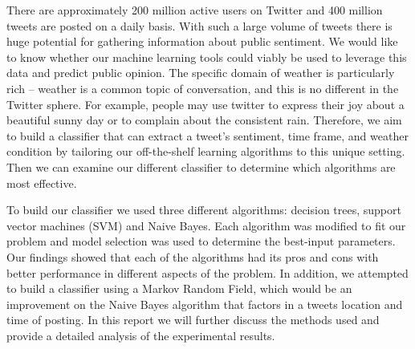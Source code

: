 	There are approximately 200 million active users on Twitter and 400 million tweets are posted on a daily basis. With such a large volume of tweets there is huge potential for gathering information about public sentiment. We would like to know whether our machine learning tools could viably be used to leverage this data and predict public opinion. The specific domain of weather is particularly rich – weather is a common topic of conversation, and this is no different in the Twitter sphere. For example, people may use twitter to express their joy about a beautiful sunny day or to complain about the consistent rain. Therefore, we aim to build a classifier that can extract a tweet's sentiment, time frame, and weather condition by tailoring our off-the-shelf learning algorithms to this unique setting. Then we can examine our different classifier to determine which algorithms are most effective.

            To build our classifier we used three different algorithms: decision trees, support vector machines (SVM) and Naive Bayes. Each algorithm was modified to fit our problem and model selection was used to determine the best-input parameters. Our findings showed that each of the algorithms had its pros and cons with better performance in different aspects of the problem. In addition, we attempted to build a classifier using a Markov Random Field, which would be an improvement on the Naive Bayes algorithm that factors in a tweets location and time of posting. In this report we will further discuss the methods used and provide a detailed analysis of the experimental results.   